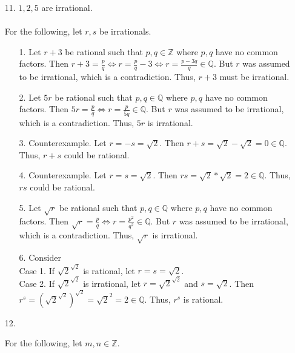 \documentclass[11pt]{exam}
\begin{document}
\begin{enumerate}[leftmargin=0pt]
\item[11.]
$1, 2, 5$ are irrational. \\
\\
For the following, let $r, s$ be irrationals.
\begin{enumerate}
    \item[1.] Let $r + 3$ be rational such that $p, q \in \mathbb{Z}$ where $p, q$ have no common factors. Then $r + 3 = \frac{p}{q} \Leftrightarrow r = \frac{p}{q} - 3 \Leftrightarrow r = \frac{p - 3q}{q} \in \mathbb{Q}$. But $r$ was assumed to be irrational, which is a contradiction. Thus, $r + 3$ must be irrational. 
    \item[2.] Let $5r$ be rational such that $p, q \in \mathbb{Q}$ where $p, q$ have no common factors. Then $5r = \frac{p}{q} \Leftrightarrow r = \frac{p}{5q} \in \mathbb{Q}$. But $r$ was assumed to be irrational, which is a contradiction. Thus, $5r$ is irrational.
    \item[3.] Counterexample. Let $r = -s = \sqrt{2}$. Then $r + s = \sqrt{2} - \sqrt{2} = 0 \in \mathbb{Q}$. Thus, $r + s$ could be rational.
    \item[4.] Counterexample. Let $r = s = \sqrt{2}$. Then $rs = \sqrt{2} * \sqrt{2} = 2 \in \mathbb{Q}$. Thus, $rs$ could be rational.
    \item[5.] Let $\sqrt{r}$ be rational such that $p, q \in \mathbb{Q}$ where $p, q$ have no common factors. Then $\sqrt{r} = \frac{p}{q} \Leftrightarrow r = \frac{p^2}{q^2} \in \mathbb{Q}$. But $r$ was assumed to be irrational, which is a contradiction. Thus, $\sqrt{r}$ is irrational. 
    \item[6.] Consider \\
    Case 1. If $\sqrt{2}^{\sqrt{2}}$ is rational, let $r = s = \sqrt{2}$. \\
    Case 2. If $\sqrt{2}^{\sqrt{2}}$ is irrational, let $r = \sqrt{2}^{\sqrt{2}}$ and $s = \sqrt{2}$. Then $r^s = (\sqrt{2}^{\sqrt{2}})^{\sqrt{2}} = \sqrt{2}^2 = 2 \in \mathbb{Q}$. Thus, $r^s$ is rational.
    
\end{enumerate}

\item[12.]

For the following, let $m, n \in \mathbb{Z}$.


\end{enumerate}
\end{document}
